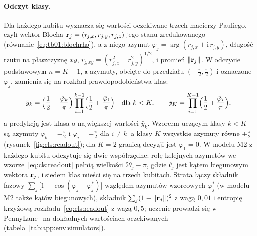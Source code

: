 \paragraph{Odczyt klasy.}
Dla każdego kubitu wyznacza się wartości oczekiwane trzech macierzy Pauliego, czyli wektor Blocha $\mathbf{r}_j=(r_{j,x},r_{j,y},r_{j,z})$ jego stanu zredukowanego (równanie~\eqref{eq:tb01:blochrho}), a z niego azymut $\varphi_j=\arg(r_{j,x}+\mathrm{i}\,r_{j,y})$, długość rzutu na płaszczyznę $xy$, $r_{j,xy}=(r_{j,x}^2+r_{j,y}^2)^{1/2}$, i promień $\|\mathbf{r}_j\|$.
W odczycie podstawowym $n=K-1$, a azymuty, obcięte do przedziału $(-\tfrac{\pi}{2},\tfrac{\pi}{2})$ i oznaczone $\bar{\varphi}_j$, zamienia się na rozkład prawdopodobieństwa klas:
\begin{equation}\label{eq:cls:readout}
\hat{y}_k=\Bigl(\frac{1}{2}-\frac{\bar{\varphi}_k}{\pi}\Bigr)\prod_{i=1}^{k-1}\Bigl(\frac{1}{2}+\frac{\bar{\varphi}_i}{\pi}\Bigr)\quad\text{dla } k<K,\qquad
\hat{y}_K=\prod_{i=1}^{K-1}\Bigl(\frac{1}{2}+\frac{\bar{\varphi}_i}{\pi}\Bigr),
\end{equation}
a predykcją jest klasa o największej wartości $\hat{y}_k$.
Wzorcem uczącym klasy $k<K$ są azymuty $\varphi_k=-\tfrac{\pi}{2}$ i $\varphi_i=+\tfrac{\pi}{2}$ dla $i\neq k$, a klasy $K$ wszystkie azymuty równe $+\tfrac{\pi}{2}$ (rysunek~\ref{fig:cls:readout}); dla $K=2$ granicą decyzji jest $\varphi_1=0$.
W modelu M2 z każdego kubitu odczytuje się dwie współrzędne: rolę kolejnych azymutów we wzorze~\eqref{eq:cls:readout} pełnią wielkości $2\theta_j-\pi$, gdzie $\theta_j$ jest kątem biegunowym wektora $\mathbf{r}_j$, i siedem klas mieści się na trzech kubitach.
Strata łączy składnik fazowy $\sum_j\bigl[1-\cos(\varphi_j-\varphi_j^{\ast})\bigr]$ względem azymutów wzorcowych $\varphi_j^{\ast}$ (w modelu M2 także kątów biegunowych), składnik $\sum_j(1-\|\mathbf{r}_j\|)^2$ z wagą $0{,}01$ i entropię krzyżową rozkładu~\eqref{eq:cls:readout} z wagą $0{,}5$; uczenie prowadzi się w PennyLane~\cite{bergholm_pennylane_2018} na dokładnych wartościach oczekiwanych (tabela~\ref{tab:app:env:simulators}).

